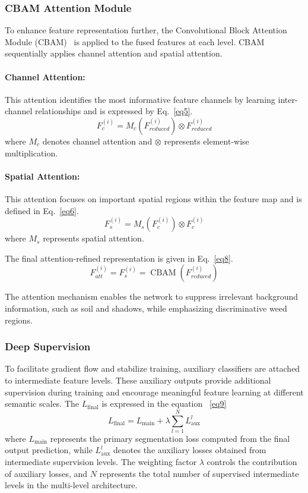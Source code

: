 \documentclass[pdflatex,sn-mathphys-num]{sn-jnl}
\begin{document}
\subsubsection{CBAM Attention Module}

To enhance feature representation further, the Convolutional
Block Attention Module (CBAM)~\cite{woo2018cbam} is applied
to the fused features at each level. CBAM sequentially applies
channel attention and spatial attention.

\paragraph{Channel Attention:}
This attention identifies the most informative feature
channels by learning inter-channel relationships and is
expressed by Eq.~\ref{eq5}.
\begin{equation}
F_{c}^{(i)} = M_c(F_{reduced}^{(i)}) \otimes
F_{reduced}^{(i)}
\label{eq5}
\end{equation}
where $M_c$ denotes channel attention and $\otimes$
represents element-wise multiplication.

\paragraph{Spatial Attention:}
This attention focuses on important spatial regions within
the feature map and is defined in Eq.~\ref{eq6}.
\begin{equation}
F_{s}^{(i)} = M_s(F_c^{(i)}) \otimes F_c^{(i)}
\label{eq6}
\end{equation}
where $M_s$ represents spatial attention.

The final attention-refined representation is given
in Eq.~\ref{eq8}.
\begin{equation}
F_{att}^{(i)} = F_s^{(i)}
= \operatorname{CBAM}(F_{reduced}^{(i)})
\label{eq8}
\end{equation}

The attention mechanism enables the network to suppress
irrelevant background information, such as soil and shadows,
while emphasizing discriminative weed regions.

\subsubsection{Deep Supervision}
To facilitate gradient flow and stabilize training, auxiliary classifiers are attached to intermediate feature levels. These auxiliary outputs provide additional supervision during training and encourage meaningful feature learning at different semantic scales. The $L_{\text{final}}$ is expressed in the equation ~\ref{eq9}
\begin{equation}
L_{\text{final}} = L_{\text{main}} + \lambda \sum_{l=1}^{N} L_{\text{aux}}^{l}\label{eq9}
\end{equation}
where \(L_{\text{main}}\) represents the primary segmentation loss computed from the final output prediction, while \(L_{\text{aux}}^{l}\) denotes the auxiliary losses obtained from intermediate supervision levels. The weighting factor \(\lambda\) controls the contribution of auxiliary losses, and \(N\) represents the total number of supervised intermediate levels in the multi-level architecture.
\end{document}
